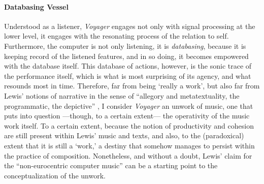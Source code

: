 \paragraph{Databasing Vessel}
Understood as a listener, \textit{Voyager} engages not only with signal processing at the lower level, it engages with the resonating process of the relation to self. Furthermore, the computer is not only listening, it is \textit{databasing}, because it is keeping record of the listened features, and in so doing, it becomes empowered with the database itself. This database of actions, however, is the sonic trace of the performance itself, which is what is most surprising of its agency, and what resounds most in time. Therefore, far from being `really a work', but also far from Lewis' notions of narrative in the sense of ``allegory and metatextuality, the programmatic, the depictive'' \parencite[110]{Lew99:Int}, I consider \textit{Voyager} an unwork of music, one that puts into question ---though, to a certain extent--- the operativity of the music work itself. To a certain extent, because the notion of productivity and cohesion are still present within Lewis' music and texts, and also, to the (paradoxical) extent that it is still a `work,' a destiny that somehow manages to persist within the practice of composition. Nonetheless, and without a doubt, Lewis' claim for the ``non-eurocentric computer music'' \parencite[107]{Lew99:Int} can be a starting point to the conceptualization of the unwork.

